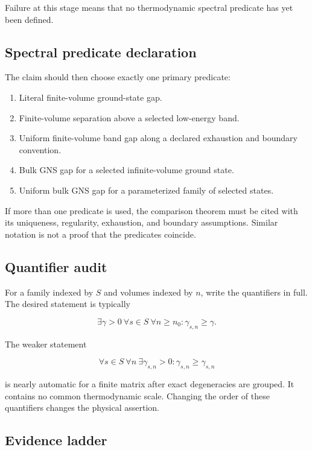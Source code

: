 \documentclass[12pt]{article}
\theoremstyle{definition}
\theoremstyle{remark}
\begin{document}
Failure at this stage means that no thermodynamic spectral predicate has yet
been defined.

\subsection{Spectral predicate declaration}

The claim should then choose exactly one primary predicate:

\begin{enumerate}[label=\textbf{G\arabic*.}]
  \item Literal finite-volume ground-state gap.
  \item Finite-volume separation above a selected low-energy band.
  \item Uniform finite-volume band gap along a declared exhaustion and boundary
  convention.
  \item Bulk GNS gap for a selected infinite-volume ground state.
  \item Uniform bulk GNS gap for a parameterized family of selected states.
\end{enumerate}

If more than one predicate is used, the comparison theorem must be cited with
its uniqueness, regularity, exhaustion, and boundary assumptions. Similar
notation is not a proof that the predicates coincide.

\subsection{Quantifier audit}

For a family indexed by $S$ and volumes indexed by $n$, write the quantifiers
in full. The desired statement is typically

\[
\exists\gamma>0\ \forall s\in S\ \forall n\geq n_0:
\gamma_{s,n}\geq\gamma.
\]

The weaker statement

\[
\forall s\in S\ \forall n\ \exists\gamma_{s,n}>0:
\gamma_{s,n}\geq\gamma_{s,n}
\]

is nearly automatic for a finite matrix after exact degeneracies are grouped.
It contains no common thermodynamic scale. Changing the order of these
quantifiers changes the physical assertion.

\subsection{Evidence ladder}
\end{document}
